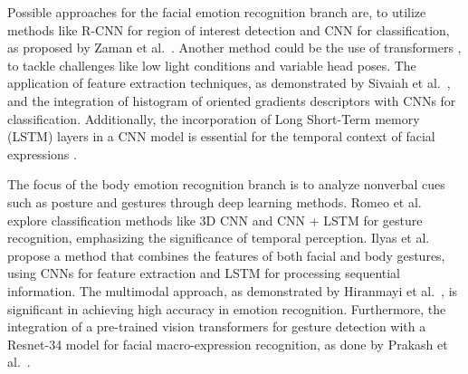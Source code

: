 \documentclass[runningheads]{llncs}
\begin{document}
Possible approaches for the facial emotion recognition branch are, to utilize methods like R-CNN for region of interest detection and CNN for classification, as proposed by Zaman et al.~\cite{Zaman2022}. Another method could be the use of transformers \cite{Yao2023}, to tackle challenges like low light conditions and variable head poses. The application of feature extraction techniques, as demonstrated by Sivaiah et al.~\cite{Bellamkonda2020}, and the integration of histogram of oriented gradients descriptors with CNNs for classification. Additionally, the incorporation of Long Short-Term memory (LSTM) layers in a CNN model is essential for the temporal context of facial expressions \cite{Mukhiddinov2023}.

The focus of the body emotion recognition branch is to analyze nonverbal cues such as posture and gestures through deep learning methods. Romeo et al.~\cite{Romeo2021} explore classification methods like 3D CNN and CNN + LSTM for gesture recognition, emphasizing the significance of temporal perception. Ilyas et al.~\cite{Ilyas2021} propose a method that combines the features of both facial and body gestures, using CNNs for feature extraction and LSTM for processing sequential information. The multimodal approach, as demonstrated by Hiranmayi et al.~\cite{Ranganathan2016}, is significant in achieving high accuracy in emotion recognition. Furthermore, the integration of a pre-trained vision transformers for gesture detection with a Resnet-34 model for facial macro-expression recognition, as done by Prakash et al.~\cite{Prakash2023}.
\end{document}
